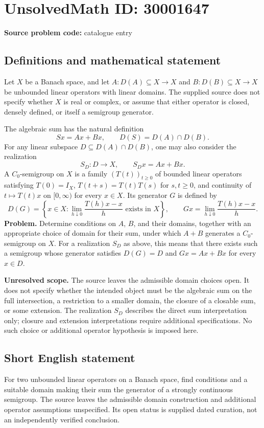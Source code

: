 \documentclass[11pt]{article}
\begin{document}
\section*{UnsolvedMath ID: 30001647}
\textbf{Source problem code:} catalogue entry
\subsection{Definitions and mathematical statement}
Let \(X\) be a Banach space, and let \(A\colon D(A)\subseteq X\to X\) and \(B\colon D(B)\subseteq X\to X\) be unbounded linear operators with linear domains. The supplied source does not specify whether \(X\) is real or complex, or assume that either operator is closed, densely defined, or itself a semigroup generator.

The algebraic sum has the natural definition
\[
Sx=Ax+Bx,\qquad D(S)=D(A)\cap D(B).
\]
For any linear subspace \(D\subseteq D(A)\cap D(B)\), one may also consider the realization
\[
S_D\colon D\to X,\qquad S_Dx=Ax+Bx.
\]
A \(C_0\)-semigroup on \(X\) is a family \((T(t))_{t\geq0}\) of bounded linear operators satisfying \(T(0)=I_X\), \(T(t+s)=T(t)T(s)\) for \(s,t\geq0\), and continuity of \(t\mapsto T(t)x\) on \([0,\infty)\) for every \(x\in X\). Its generator \(G\) is defined by
\[
D(G)=\left\{x\in X:\lim_{h\downarrow0}\frac{T(h)x-x}{h}\text{ exists in }X\right\},\qquad
Gx=\lim_{h\downarrow0}\frac{T(h)x-x}{h}.
\]
\textbf{Problem.} Determine conditions on \(A\), \(B\), and their domains, together with an appropriate choice of domain for their sum, under which \(A+B\) generates a \(C_0\)-semigroup on \(X\). For a realization \(S_D\) as above, this means that there exists such a semigroup whose generator satisfies \(D(G)=D\) and \(Gx=Ax+Bx\) for every \(x\in D\).

\textbf{Unresolved scope.} The source leaves the admissible domain choices open. It does not specify whether the intended object must be the algebraic sum on the full intersection, a restriction to a smaller domain, the closure of a closable sum, or some extension. The realization \(S_D\) describes the direct sum interpretation only; closure and extension interpretations require additional specifications. No such choice or additional operator hypothesis is imposed here.
\subsection{Short English statement}
For two unbounded linear operators on a Banach space, find conditions and a suitable domain making their sum the generator of a strongly continuous semigroup. The source leaves the admissible domain construction and additional operator assumptions unspecified. Its open status is supplied dated curation, not an independently verified conclusion.
\end{document}
